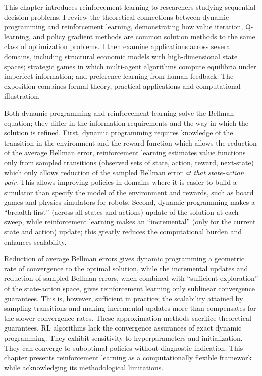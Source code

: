 This chapter introduces reinforcement learning to researchers studying sequential decision problems. I review the theoretical connections between dynamic programming and reinforcement learning, demonstrating how value iteration, Q-learning, and policy gradient methods are common solution methods to the same class of optimization problems. I then examine applications across several domains, including structural economic models with high-dimensional state spaces; strategic games in which multi-agent algorithms compute equilibria under imperfect information; and preference learning from human feedback. The exposition combines formal theory, practical applications and computational illustration.

Both dynamic programming and reinforcement learning solve the Bellman equation; they differ in the information requirements and the way in which the solution is refined. First, dynamic programming requires knowledge of the transition in the environment and the reward function which allows the reduction of the average Bellman error, reinforcement learning estimates value functions only from sampled transitions (observed sets of state, action, reward, next-state) which only allows reduction of the sampled Bellman error \textit{at that state-action pair}. This allows improving policies in domains where it is easier to build a simulator than specify the model of the environment and rewards, such as board games and physics simulators for robots. Second, dynamic programming makes a ``breadth-first'' (across all states and actions) update of the solution at each sweep, while reinforcement learning makes an ``incremental'' (only for the current state and action) update; this greatly reduces the computational burden and enhances scalability.

Reduction of average Bellman errors gives dynamic programming a geometric rate of convergence to the optimal solution, while the incremental updates and reduction of sampled Bellman errors, when combined with ``sufficient exploration'' of the state-action space, gives reinforcement learning only sublinear convergence guarantees. This is, however, sufficient in practice; the scalability attained by sampling transitions and making incremental updates more than compensates for the slower convergence rates. These approximation methods sacrifice theoretical guarantees. RL algorithms lack the convergence assurances of exact dynamic programming. They exhibit sensitivity to hyperparameters and initialization. They can converge to suboptimal policies without diagnostic indication. This chapter presents reinforcement learning as a computationally flexible framework while acknowledging its methodological limitations.

